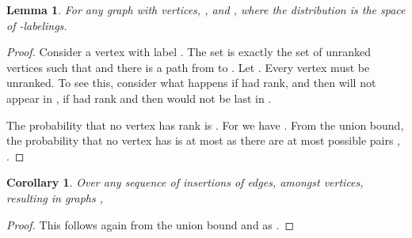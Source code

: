 \documentclass[11pt]{article}
\theoremstyle{plain}
\newtheorem{cor}[thm]{Corollary}
\newtheorem{lem}[thm]{Lemma}
\theoremstyle{definition}
\theoremstyle{remark}
\numberwithin{equation}{section}
\begin{document}
 \begin{lem} \label{lem:backsize}
   For any graph  with  vertices, , and ,  where the distribution  is the space of -labelings.
 \end{lem}
 \begin{proof}
   Consider a vertex  with label . The set  is exactly the set of unranked vertices such that  and there is a path from  to .
   Let . Every vertex  must be unranked. To see this, consider what happens if  had rank, and  then  will not appear in , if  had rank and  then  would not be last in .

  The probability that no vertex  has rank is . For  we have .
  From the union bound, the probability that no vertex  has  is at most  as there are at most  possible pairs , .

\end{proof}

\begin{cor}\label{cor:backsize}
  Over any sequence of insertions of edges, amongst  vertices, resulting in graphs , 
\end{cor}
\begin{proof}
  This follows again from the union bound and as .
\end{proof}
\end{document}
